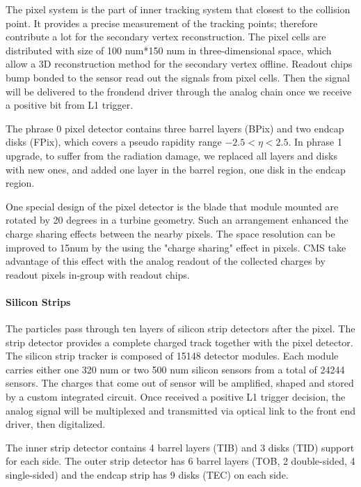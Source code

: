 The pixel system is the part of inner tracking system that closest to the collision point. It provides a precise measurement of the tracking points; therefore contribute a lot for the secondary vertex reconstruction. The pixel cells are distributed with size of 100 num*150 num in three-dimensional space, which allow a 3D reconstruction method for the secondary vertex offline. Readout chips bump bonded to the sensor read out the signals from pixel cells. Then the signal will be delivered to the frondend driver through the analog chain once we receive a positive bit from L1 trigger.

The phrase 0 pixel detector contains three barrel layers (BPix) and two endcap disks (FPix), which covers a pseudo rapidity range $-2.5<\eta<2.5$. In phrase 1 upgrade\cite{Klein:2140071}, to suffer from the radiation damage, we replaced all layers and disks with new ones, and added one layer in the barrel region, one disk in the endcap region.

One special design of the pixel detector is the blade that module mounted are rotated by 20 degrees in a turbine geometry. Such an arrangement enhanced the charge sharing effects\cite{Giurgiu:2008ir} between the nearby pixels. The space resolution can be improved to 15num by the using the "charge sharing" effect in pixels. CMS take advantage of this effect with the analog readout of the collected charges by readout pixels in-group with readout chips. 

\paragraph{Silicon Strips}

The particles pass through ten layers of silicon strip detectors after the pixel. The strip detector provides a complete charged track together with the pixel detector. The silicon strip tracker is composed of 15148 detector modules. Each module carries either one 320 num or two 500 num silicon sensors from a total of 24244 sensors. The charges that come out of sensor will be amplified, shaped and stored by a custom integrated circuit. Once received a positive L1 trigger decision, the analog signal will be multiplexed and transmitted via optical link to the front end driver, then digitalized. 

The inner strip detector contains 4 barrel layers (TIB) and 3 disks (TID) support for each side. The outer strip detector has 6 barrel layers (TOB, 2 double-sided, 4 single-sided) and the endcap strip has 9 disks (TEC) on each side.


